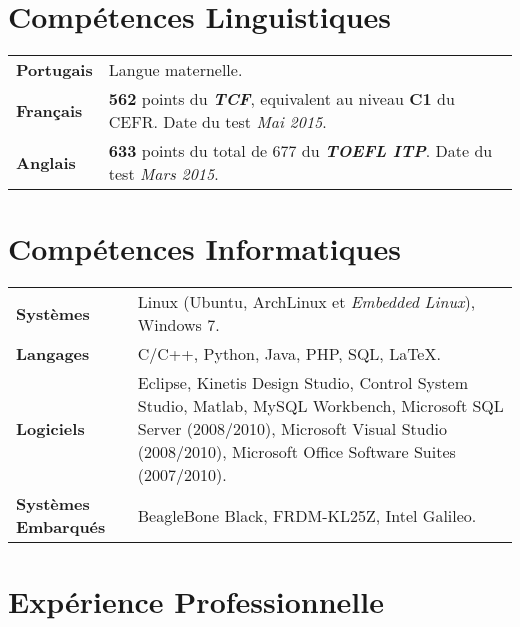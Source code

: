 \documentclass[10pt, a4paper]{article}
\begin{document}



\section{Compétences Linguistiques}

\begin{tabular}{p{} p{}}

\textbf{Portugais} & Langue maternelle.  \\ 

\textbf{Français} & \textbf{562} points du \textbf{\textit{TCF}},
equivalent au niveau \textbf{C1} du CEFR. Date du test \textit{Mai
2015}.\\

\textbf{Anglais} & \textbf{633} points du total de 677 du \textbf{\textit{TOEFL
ITP}}. Date du test \textit{Mars 2015}. \\  

\end{tabular}


\section{Compétences Informatiques} 

\begin{tabular}{p{} p{}}

 \textbf{Systèmes} & Linux (Ubuntu, ArchLinux et \textit{Embedded Linux}),
 Windows 7.  \\

 \textbf{Langages} & C/C++, Python, Java, PHP,  SQL, \LaTeX. \\ 
 
 \textbf{Logiciels} & Eclipse, Kinetis Design Studio, Control System
 Studio, Matlab, MySQL Workbench, Microsoft SQL Server (2008/2010), Microsoft
 Visual Studio (2008/2010),  Microsoft Office Software Suites (2007/2010). \\
 
  \textbf{Systèmes \newline Embarqués} & BeagleBone Black, FRDM-KL25Z,
  Intel Galileo. \\
\end{tabular}


\section{Expérience Professionnelle}
\end{document}
